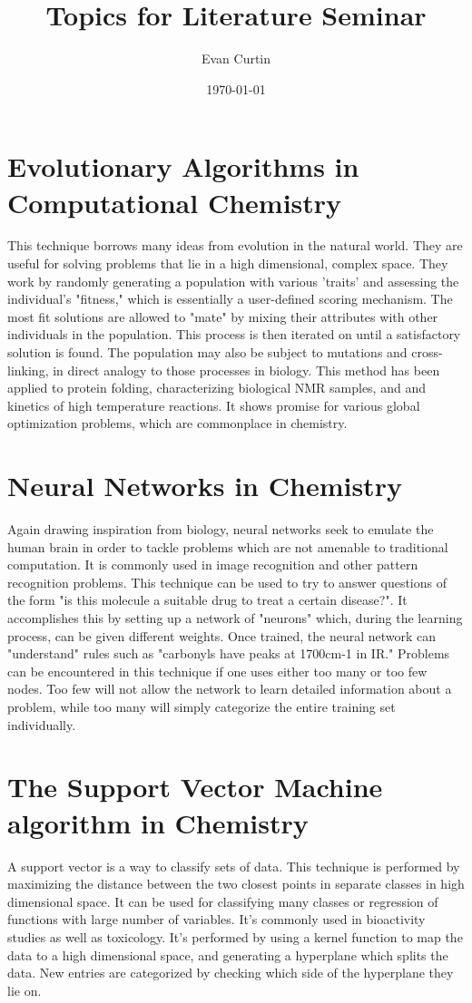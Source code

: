 \documentclass{revtex4}
\begin{document}
\title{Topics for Literature Seminar}
\author{Evan Curtin}
\date{\today}
\maketitle


\section{Evolutionary Algorithms in Computational Chemistry}
This technique borrows many ideas from evolution in the natural world. They are useful for solving problems that lie in a high dimensional, complex space. They work by randomly generating a population with various 'traits' and assessing the individual's "fitness," which is essentially a user-defined scoring mechanism. The most fit solutions are allowed to "mate" by mixing their attributes with other individuals in the population. This process is then iterated on until a satisfactory solution is found. The population may also be subject to mutations and cross-linking, in direct analogy to those processes in biology. This method has been applied to protein folding, characterizing biological NMR samples, and and kinetics of high temperature reactions. It shows promise for various global optimization problems, which are commonplace in chemistry. 

\section{Neural Networks in Chemistry}
Again drawing inspiration from biology, neural networks seek to emulate the human brain in order to tackle problems which are not amenable to traditional computation. It is commonly used in image recognition and other pattern recognition problems. This technique can be used to try to answer questions of the form "is this molecule a suitable drug to treat a certain disease?". It accomplishes this by setting up a network of "neurons" which, during the learning process, can be given different weights. Once trained, the neural network can "understand" rules such as "carbonyls have peaks at 1700cm-1 in IR." Problems can be encountered in this technique if one uses either too many or too few nodes. Too few will not allow the network to learn detailed information about a problem, while too many will simply categorize the entire training set individually. 

\section{The Support Vector Machine algorithm in Chemistry}
A support vector is a way to classify sets of data. This technique is performed by maximizing the distance between the two closest points in separate classes in high dimensional space. It can be used for classifying many classes or regression of functions with large number of variables. It's commonly used in bioactivity studies as well as toxicology. It's performed by using a kernel function to map the data to a high dimensional space, and generating a hyperplane which splits the data. New entries are categorized by checking which side of the hyperplane they lie on. 
\end{document}
